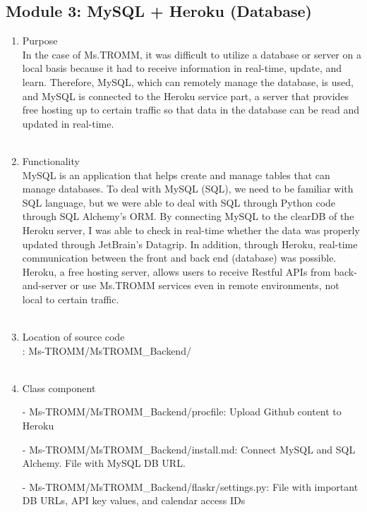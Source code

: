 \documentclass[conference]{IEEEtran}
\begin{document}
\subsection{Module 3: MySQL + Heroku (Database)}
\begin{enumerate}
    \item Purpose \\
    In the case of Ms.TROMM, it was difficult to utilize a database or server on a local basis because it had to receive information in real-time, update, and learn. Therefore, MySQL, which can remotely manage the database, is used, and MySQL is connected to the Heroku service part, a server that provides free hosting up to certain traffic so that data in the database can be read and updated in real-time. \\ \\
    \item Functionality \\
    MySQL is an application that helps create and manage tables that can manage databases. To deal with MySQL (SQL), we need to be familiar with SQL language, but we were able to deal with SQL through Python code through SQL Alchemy's ORM. By connecting MySQL to the clearDB of the Heroku server, I was able to check in real-time whether the data was properly updated through JetBrain's Datagrip. In addition, through Heroku, real-time communication between the front and back end (database) was possible. Heroku, a free hosting server, allows users to receive Restful APIs from back-and-server or use Ms.TROMM services even in remote environments, not local to certain traffic.\\ \\
    \item Location of source code\\: Ms-TROMM/MsTROMM\_Backend/ \\ \\
    \item Class component \\
        \item[-] Ms-TROMM/MsTROMM\_Backend/procfile: Upload Github content to Heroku \\
        \item[-] Ms-TROMM/MsTROMM\_Backend/install.md: Connect MySQL and SQL Alchemy. File with MySQL DB URL. \\
        \item[-] Ms-TROMM/MsTROMM\_Backend/flaskr/settings.py: File with important DB URLs, API key values, and calendar access IDs \\ \\

\end{enumerate}
\end{document}
